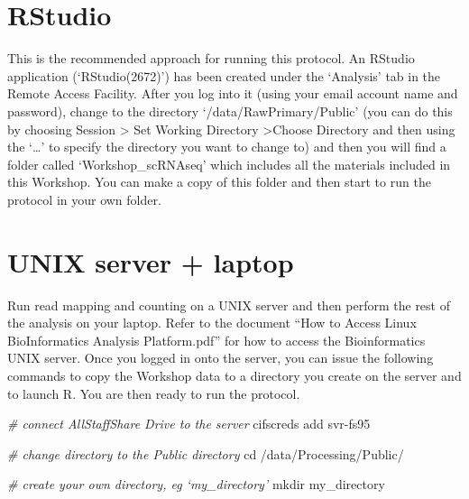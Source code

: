\documentclass[
]{book}
\newenvironment{Shaded}{\begin{snugshade}}{\end{snugshade}}
\newcommand{\BuiltInTok}[1]{#1}
\newcommand{\CommentTok}[1]{\textcolor[rgb]{0.56,0.35,0.01}{\textit{#1}}}
\newcommand{\ExtensionTok}[1]{#1}
\newcommand{\FunctionTok}[1]{\textcolor[rgb]{0.00,0.00,0.00}{#1}}
\newcommand{\NormalTok}[1]{#1}
\begin{document}
\hypertarget{rstudio}{%
\section{RStudio}\label{rstudio}}

This is the recommended approach for running this protocol. An RStudio application (`RStudio(2672)') has been created under the `Analysis' tab in the Remote Access Facility. After you log into it (using your email account name and password), change to the directory `/data/RawPrimary/Public' (you can do this by choosing Session \textgreater{} Set Working Directory \textgreater Choose Directory and then using the `\ldots{}' to specify the directory you want to change to) and then
you will find a folder called `Workshop\_scRNAseq' which includes all the materials included in this Workshop. You can make a copy of this folder and then start to run the protocol in your own folder.

\hypertarget{setup}{%
\section{UNIX server + laptop}\label{setup}}

Run read mapping and counting on a UNIX server and then perform the rest of the analysis on your laptop. Refer to the document ``How to Access Linux BioInformatics Analysis Platform.pdf'' for how to access the Bioinformatics UNIX server. Once you logged in onto the server, you can issue the following commands to copy the Workshop data to a directory you create on the server and to launch R. You are then ready to run the protocol.

\begin{Shaded}
\begin{Highlighting}[]
\CommentTok{\# connect AllStaffShare Drive to the server}
\ExtensionTok{cifscreds}\NormalTok{ add svr{-}fs95}
\end{Highlighting}
\end{Shaded}

\begin{Shaded}
\begin{Highlighting}[]
\CommentTok{\# change directory to the Public directory}
\BuiltInTok{cd}\NormalTok{ /data/Processing/Public/}
\end{Highlighting}
\end{Shaded}

\begin{Shaded}
\begin{Highlighting}[]
\CommentTok{\# create your own directory, eg ‘my\_directory’}
\FunctionTok{mkdir}\NormalTok{ my\_directory}
\end{Highlighting}
\end{Shaded}
\end{document}
